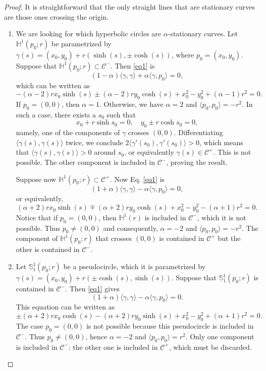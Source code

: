 \documentclass[a4paper,12pt]{amsart}
\theoremstyle{definition}
\def\h{\mathbb H}
\def\s{\mathbb S}
\begin{document}
\begin{proof}
It is straightforward that the only straight lines that are stationary curves are those ones crossing the origin. 

\begin{enumerate}
\item We are looking for which hyperbolic circles are $\alpha$-stationary curves. Let $\h^1(p_0;r)$ be parametrized by $\gamma(s)=(x_0,y_0)+r(\sinh(s),\pm\cosh(s))$, where $p_0=(x_0,y_0)$. Suppose that  $\h^1(p_0;r)\subset\mathcal{C}^-$. Then \eqref{eq1} is 
$$(1-\alpha)\langle\gamma,\gamma\rangle+\alpha\langle\gamma,p_0\rangle=0,$$
which can be written as
$$-(\alpha -2) r x_0 \sinh (s)  \pm (\alpha -2) r y_0 \cosh (s)+x_0^2-y_0^2+(\alpha-1)r^2=0.$$
If $p_0=(0,0)$, then $\alpha=1$. Otherwise, we have $\alpha=2$ and   $\langle p_0,p_0\rangle=-r^2$. 
In such a case,  there exists a $s_0$ such that 
$$
x_0+r\sinh s_0=0, \quad y_0 \pm r\cosh s_0=0,
$$
namely, one of the components of $\gamma$ crosses $(0,0)$. Differentiating $\langle \gamma(s),\gamma(s)\rangle$ twice, we conclude $2\langle \gamma'(s_0),\gamma'(s_0)\rangle>0$, which means that $\langle \gamma(s),\gamma(s)\rangle >0$ around $s_0$, or equivalently $\gamma(s)\in \mathcal{C}^+$. This is not possible. The  other component is  included in $\mathcal{C}^-$, proving the result. 

Suppose now $\h^1(p_0;r)\subset\mathcal{C}^+$. Now Eq.  \eqref{eq1} is 
$$(1+\alpha)\langle\gamma,\gamma\rangle-\alpha\langle\gamma,p_0\rangle=0,$$
or equivalently, 
$$(\alpha +2) r x_0 \sinh (s)  \mp  (\alpha +2) r y_0 \cosh (s)+x_0^2-y_0^2-(\alpha+1)  r^2=0.$$
Notice that if $p_0=(0,0)$, then $\h^1(r)$ is included in $\mathcal{C}^-$, which it is not possible. Thus $p_0\not=(0,0)$ and consequently,  $\alpha=-2$ and   $\langle p_0,p_0\rangle=-r^2$. The component of $\h^1(p_0;r)$ that crosses $(0,0)$ is contained in $\mathcal{C}^+$ but the other is contained in $\mathcal{C}^-$.
 
 \item Let $\s^1_{1}(p_0;r)$ be a pseudocircle, which it is parametrized by $\gamma(s)=(x_0,y_0)+r(\pm \cosh (s),\sinh(s))$. Suppose that $\s^1_{1}(p_0;r)$ is contained in $\mathcal{C}^-$. Then \eqref{eq1} gives
 $$(1+\alpha)\langle\gamma,\gamma\rangle-\alpha\langle\gamma,p_0\rangle=0.$$
This equation can be written as
$$  \pm  (\alpha +2) r x_0 \cosh (s)-(\alpha +2) r y_0 \sinh (s)+x_0^2-y_0^2+(\alpha+1)r^2=0.$$
 The case $p_0=(0,0)$ is not possible because this pseudocircle  is included in $\mathcal{C}^-$. Thus $p_0\not=(0,0)$, hence $\alpha=-2$ and $\langle p_0,p_0\rangle=r^2$. Only one component is included in $\mathcal{C}^-$: the other one is included in $\mathcal{C}^+$, which must be discarded.
 

\end{enumerate}
\end{proof}
\end{document}
